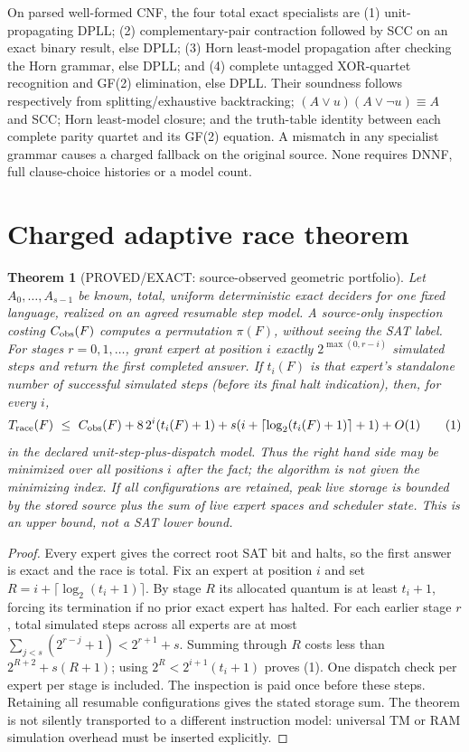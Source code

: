 \documentclass[11pt]{article}
\newtheorem{theorem}{Theorem}
\begin{document}
On parsed well-formed CNF, the four total exact specialists are (1) unit-propagating DPLL; (2) complementary-pair contraction followed by SCC on an exact binary result, else DPLL; (3) Horn least-model propagation after checking the Horn grammar, else DPLL; and (4) complete untagged XOR-quartet recognition and GF(2) elimination, else DPLL. Their soundness follows respectively from splitting/exhaustive backtracking; $(A\vee u)(A\vee\neg u)\equiv A$ and SCC; Horn least-model closure; and the truth-table identity between each complete parity quartet and its GF(2) equation. A mismatch in any specialist grammar causes a charged fallback on the original source. None requires DNNF, full clause-choice histories or a model count.

\section{Charged adaptive race theorem}
\begin{theorem}[PROVED/EXACT: source-observed geometric portfolio]
Let $A_0,\ldots,A_{s-1}$ be known, total, uniform deterministic exact deciders for one fixed language, realized on an agreed resumable step model. A source-only inspection costing $C_{\rm obs}(F)$ computes a permutation $\pi(F)$, without seeing the SAT label. For stages $r=0,1,\ldots$, grant expert at position $i$ exactly $2^{\max(0,r-i)}$ simulated steps and return the first completed answer. If $t_i(F)$ is that expert's standalone number of successful simulated steps (before its final halt indication), then, for every $i$,
\[
T_{\rm race}(F)\ \le\
C_{\rm obs}(F)+8\,2^i(t_i(F)+1)
+s\!\left(i+\lceil\log_2(t_i(F)+1)\rceil+1\right)+O(1)
\tag{1}
\]
in the declared unit-step-plus-dispatch model. Thus the right hand side may be minimized over all positions $i$ \emph{after the fact}; the algorithm is not given the minimizing index. If all configurations are retained, peak live storage is bounded by the stored source plus the sum of live expert spaces and scheduler state. This is an \emph{upper} bound, not a SAT lower bound.
\end{theorem}
\begin{proof}
Every expert gives the correct root SAT bit and halts, so the first answer is exact and the race is total. Fix an expert at position $i$ and set $R=i+\lceil\log_2(t_i+1)\rceil$. By stage $R$ its allocated quantum is at least $t_i+1$, forcing its termination if no prior exact expert has halted. For each earlier stage $r$, total simulated steps across all experts are at most $\sum_{j<s}(2^{r-j}+1)<2^{r+1}+s$. Summing through $R$ costs less than $2^{R+2}+s(R+1)$; using $2^R<2^{i+1}(t_i+1)$ proves (1). One dispatch check per expert per stage is included. The inspection is paid once before these steps. Retaining all resumable configurations gives the stated storage sum. The theorem is not silently transported to a different instruction model: universal TM or RAM simulation overhead must be inserted explicitly.
\end{proof}
\end{document}
